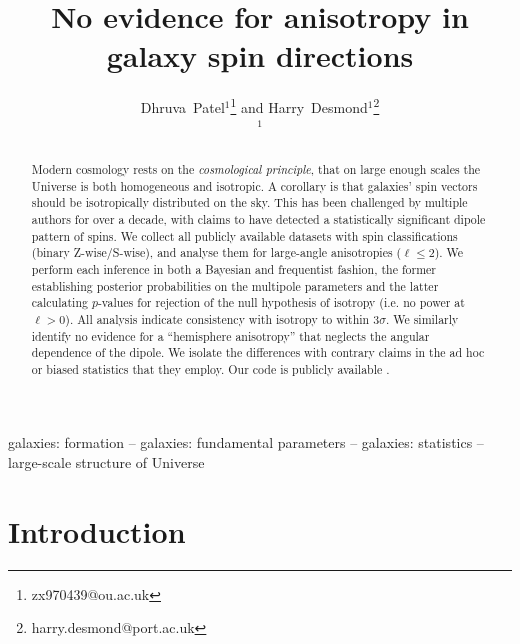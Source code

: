 \documentclass[fleqn,usenatbib,nofootinbib]{mnras}
\title[Galaxies spin isotropically]{No evidence for anisotropy in galaxy spin directions}
\author[Patel \& Desmond]{
Dhruva~Patel$^{1}$\thanks{zx970439@ou.ac.uk} and Harry~Desmond$^{1}$\thanks{harry.desmond@port.ac.uk}\\
$^{1}$\icg\\
}
\newcommand{\github}[1]{\href{#1}{\faGithubSquare}}
\newcommand{\githublink}{\github{https://github.com/harrydesmond/GalaxySpinAnisotropy}}
\begin{document}
\label{FirstPage}
\pagerange{\pageref{FirstPage}--\pageref{LastPage}}
\maketitle

\begin{abstract}
Modern cosmology rests on the \emph{cosmological principle}, that on large enough scales the Universe is both homogeneous and isotropic. A corollary is that galaxies' spin vectors should be isotropically distributed on the sky. This has been challenged by multiple authors for over a decade, with claims to have detected a statistically significant dipole pattern of spins. We collect all publicly available datasets with spin classifications (binary Z-wise/S-wise), and analyse them for large-angle anisotropies ($\ell \le 2$). We perform each inference in both a Bayesian and frequentist fashion, the former establishing posterior probabilities on the multipole parameters and the latter calculating $p$-values for rejection of the null hypothesis of isotropy (i.e. no power at $\ell>0$). All analysis indicate consistency with isotropy to within $3\sigma$. We similarly identify no evidence for a ``hemisphere anisotropy'' that neglects the angular dependence of the dipole. We isolate the differences with contrary claims in the ad hoc or biased statistics that they employ. Our code is publicly available \githublink.
\end{abstract}

\begin{keywords}
galaxies: formation -- galaxies: fundamental parameters -- galaxies: statistics -- large-scale structure of Universe
\end{keywords}




\section{Introduction}
\label{sec:intro}
\end{document}
